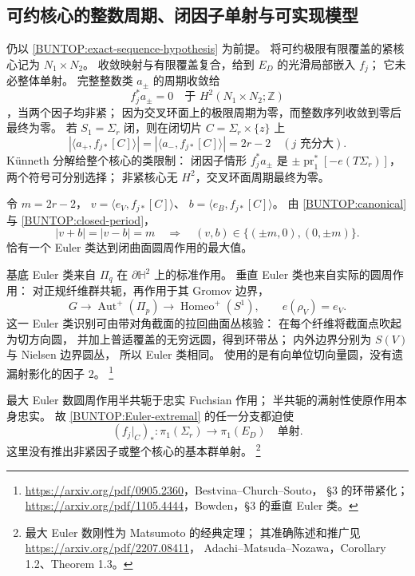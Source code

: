 \documentclass[UTF8,fontset=fandol,zihao=-4,oneside,openany]{ctexbook}
\theoremstyle{cjkplain}
\numberwithin{equation}{chapter}
\begin{document}
\subsection{可约核心的整数周期、闭因子单射与可实现模型}
\label{BUNTOP:reducible-core}

仍以 \eqref{BUNTOP:exact-sequence-hypothesis} 为前提。
将可约极限有限覆盖的紧核心记为 \(N_1\times N_2\)。
收敛映射与有限覆盖复合，给到 \(E_D\) 的光滑局部嵌入 \(f_j\)；
它未必整体单射。
完整整数类 \(a_\pm\) 的周期收敛给
\[
 f_j^*a_\pm=0\quad\text{于 }H^2(N_1\times N_2;\mathbb Z)
\]
，当两个因子均非紧；
因为交叉环面上的极限周期为零，而整数序列收敛到零后最终为零。
若 \(S_1=\Sigma_r\) 闭，则在闭切片 \(C=\Sigma_r\times\{z\}\) 上
\begin{equation}
 |\langle a_+,f_{j*}[C]\rangle|
 =|\langle a_-,f_{j*}[C]\rangle|=2r-2
 \quad(j\text{ 充分大}).
 \label{BUNTOP:closed-period}
\end{equation}
K\"unneth 分解给整个核心的类限制：
闭因子情形 \(f_j^*a_\pm\) 是
\(\pm\operatorname{pr}_1^*[-e(T\Sigma_r)]\)，
两个符号可分别选择；
非紧核心无 \(H^2\)，交叉环面周期最终为零。

令 \(m=2r-2\)，
\(v=\langle e_V,f_{j*}[C]\rangle\)、
\(b=\langle e_B,f_{j*}[C]\rangle\)。
由 \eqref{BUNTOP:canonical} 与 \eqref{BUNTOP:closed-period}，
\begin{equation}
 |v+b|=|v-b|=m
 \quad\Longrightarrow\quad
 (v,b)\in\{(\pm m,0),(0,\pm m)\}.
 \label{BUNTOP:Euler-extremal}
\end{equation}
恰有一个 Euler 类达到闭曲面圆周作用的最大值。

基底 Euler 类来自 \(\Pi_q\) 在
\(\partial\mathbb H^2\) 上的标准作用。
垂直 Euler 类也来自实际的圆周作用：
对正规纤维群共轭，再作用于其 Gromov 边界，
\[
 G\longrightarrow\operatorname{Aut}^+(\Pi_p)
   \longrightarrow\operatorname{Homeo}^+(S^1),
 \qquad e(\rho_V)=e_V .
\]
这一 Euler 类识别可由带对角截面的拉回曲面丛核验：
在每个纤维将截面点吹起为切方向圆，
并加上普适覆盖的无穷远圆，得到环带丛；
内外边界分别为 \(S(V)\) 与 Nielsen 边界圆丛，
所以 Euler 类相同。
使用的是有向单位切向量圆，没有遗漏射影化的因子 \(2\)。%
\footnote{\url{https://arxiv.org/pdf/0905.2360}，Bestvina--Church--Souto，
§3 的环带紧化；
\url{https://arxiv.org/pdf/1105.4444}，Bowden，§3 的垂直 Euler 类。}

最大 Euler 数圆周作用半共轭于忠实 Fuchsian 作用；
半共轭的满射性使原作用本身忠实。
故 \eqref{BUNTOP:Euler-extremal} 的任一分支都迫使
\begin{equation}
 (f_j|_C)_*:\pi_1(\Sigma_r)\longrightarrow\pi_1(E_D)
 \quad\text{单射}.
 \label{BUNTOP:closed-factor-injective}
\end{equation}
这里没有推出非紧因子或整个核心的基本群单射。%
\footnote{最大 Euler 数刚性为 Matsumoto 的经典定理；
其准确陈述和推广见
\url{https://arxiv.org/pdf/2207.08411}，
Adachi--Matsuda--Nozawa，Corollary 1.2、Theorem 1.3。}
\end{document}
